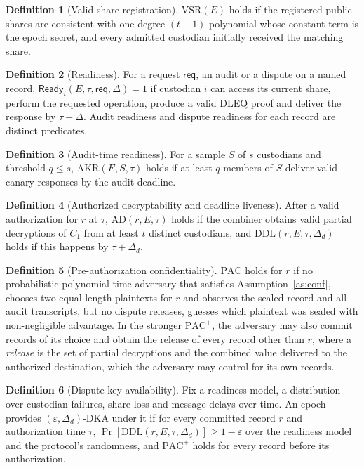\documentclass[Crown,sagev]{sagej}
\theoremstyle{plain}
\theoremstyle{definition}
\newtheorem{definition}{Definition}
\theoremstyle{remark}
\newcommand{\DKA}{\mathrm{DKA}}
\newcommand{\VSR}{\mathrm{VSR}}
\newcommand{\AKR}{\mathrm{AKR}}
\newcommand{\AD}{\mathrm{AD}}
\newcommand{\DDL}{\mathrm{DDL}}
\newcommand{\PAC}{\mathrm{PAC}}
\newcommand{\Ready}{\mathsf{Ready}}
\begin{document}
\begin{definition}[Valid-share registration]\label{def:vsr}
$\VSR(E)$ holds if the registered public shares are consistent with one degree-$(t-1)$ polynomial whose constant term is the epoch secret, and every admitted custodian initially received the matching share.
\end{definition}

\begin{definition}[Readiness]\label{def:ready}
For a request $\mathsf{req}$, an audit or a dispute on a named record, $\Ready_i(E,\tau,\mathsf{req},\Delta)=1$ if custodian $i$ can access its current share, perform the requested operation, produce a valid DLEQ proof and deliver the response by $\tau+\Delta$. Audit readiness and dispute readiness for each record are distinct predicates.
\end{definition}

\begin{definition}[Audit-time readiness]\label{def:akr}
For a sample $S$ of $s$ custodians and threshold $q\le s$, $\AKR(E,S,\tau)$ holds if at least $q$ members of $S$ deliver valid canary responses by the audit deadline.
\end{definition}

\begin{definition}[Authorized decryptability and deadline liveness]\label{def:ad}
After a valid authorization for $r$ at $\tau$, $\AD(r,E,\tau)$ holds if the combiner obtains valid partial decryptions of $C_1$ from at least $t$ distinct custodians, and $\DDL(r,E,\tau,\Delta_d)$ holds if this happens by $\tau+\Delta_d$.
\end{definition}

\begin{definition}[Pre-authorization confidentiality]\label{def:pac}
$\PAC$ holds for $r$ if no probabilistic polynomial-time adversary that satisfies Assumption~\ref{as:conf}, chooses two equal-length plaintexts for $r$ and observes the sealed record and all audit transcripts, but no dispute releases, guesses which plaintext was sealed with non-negligible advantage. In the stronger $\PAC^{+}$, the adversary may also commit records of its choice and obtain the release of every record other than $r$, where a \emph{release} is the set of partial decryptions and the combined value delivered to the authorized destination, which the adversary may control for its own records.
\end{definition}

\begin{definition}[Dispute-key availability]\label{def:dka}
Fix a readiness model, a distribution over custodian failures, share loss and message delays over time. An epoch provides $(\varepsilon,\Delta_d)$-$\DKA$ under it if for every committed record $r$ and authorization time $\tau$, $\Pr[\DDL(r,E,\tau,\Delta_d)]\ge 1-\varepsilon$ over the readiness model and the protocol's randomness, and $\PAC^{+}$ holds for every record before its authorization.
\end{definition}
\end{document}
